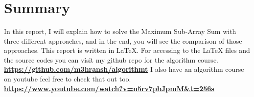\section*{Summary}
\paragraph{}
In this report, I will explain how to solve 
the Maximum Sub-Array Sum with three different 
approaches, and in the end, you will see the 
comparison of those approaches.
This report is written in \LaTeX. For accessing
to the LaTeX files and the source codes you can 
visit my github repo for the algorithm course.
\newline
\newline
\href{https://github.com/m3hransh/algorithm}{\textbf{https://github.com/m3hransh/algorithmt}}
\newline
\newline
I also have an algorithm course on youtube feel
free to check that out too.
\newline
\newline
\href{https://www.youtube.com/watch?v=n5rv7pbJpmM&t=256s}{\textbf{https://www.youtube.com/watch?v=n5rv7pbJpmM\&t=256s}}